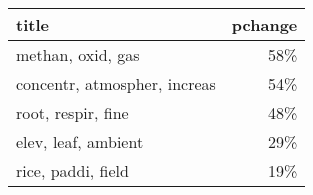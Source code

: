 \begin{tabular}{p{1.2cm}r}
\toprule
                        title &  pchange \\
\midrule
            methan, oxid, gas &      58\% \\
 concentr, atmospher, increas &      54\% \\
           root, respir, fine &      48\% \\
          elev, leaf, ambient &      29\% \\
           rice, paddi, field &      19\% \\
\bottomrule
\end{tabular}
